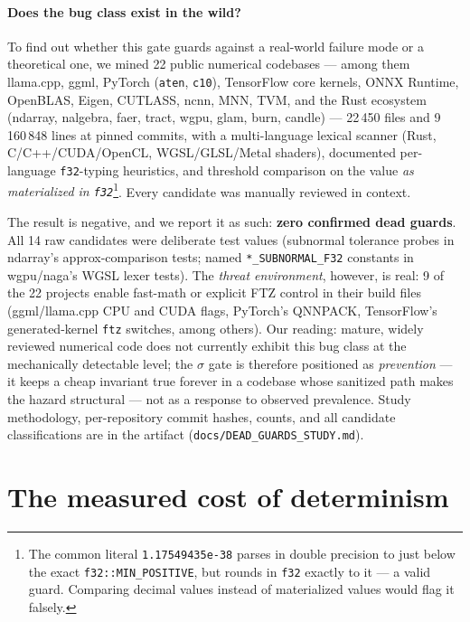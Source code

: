 \documentclass[sigconf,review]{acmart}
\begin{document}
\paragraph{Does the bug class exist in the wild?}
To find out whether this gate guards against a real-world failure mode or a
theoretical one, we mined 22 public numerical codebases --- among them
llama.cpp, ggml, PyTorch (\texttt{aten}, \texttt{c10}), TensorFlow core
kernels, ONNX Runtime, OpenBLAS, Eigen, CUTLASS, ncnn, MNN, TVM, and the
Rust ecosystem (ndarray, nalgebra, faer, tract, wgpu, glam, burn, candle)
--- 22\,450 files and 9\,160\,848 lines at pinned commits, with a
multi-language lexical scanner (Rust, C/C++/CUDA/OpenCL, WGSL/GLSL/Metal
shaders), documented per-language \texttt{f32}-typing heuristics, and
threshold comparison on the value \emph{as materialized in
\texttt{f32}}\footnote{The common literal \texttt{1.17549435e-38} parses in
double precision to just below the exact \texttt{f32::MIN\_POSITIVE}, but
rounds in \texttt{f32} exactly to it --- a valid guard. Comparing decimal
values instead of materialized values would flag it falsely.}. Every
candidate was manually reviewed in context.

The result is negative, and we report it as such: \textbf{zero confirmed
dead guards}. All 14 raw candidates were deliberate test values (subnormal
tolerance probes in ndarray's approx-comparison tests; named
\texttt{*\_SUBNORMAL\_F32} constants in wgpu/naga's WGSL lexer tests). The
\emph{threat environment}, however, is real: 9 of the 22 projects enable
fast-math or explicit FTZ control in their build files (ggml/llama.cpp CPU
and CUDA flags, PyTorch's QNNPACK, TensorFlow's generated-kernel
\texttt{ftz} switches, among others). Our reading: mature, widely reviewed
numerical code does not currently exhibit this bug class at the
mechanically detectable level; the $\sigma$ gate is therefore positioned as
\emph{prevention} --- it keeps a cheap invariant true forever in a codebase
whose sanitized path makes the hazard structural --- not as a response to
observed prevalence. Study methodology, per-repository commit hashes,
counts, and all candidate classifications are in the artifact
(\texttt{docs/DEAD\_GUARDS\_STUDY.md}).

\section{The measured cost of determinism}
\label{sec:cost}
\end{document}
